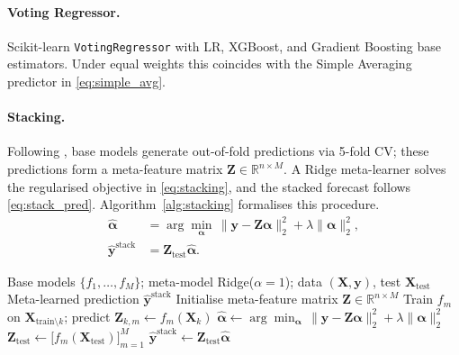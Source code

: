 \documentclass[a4paper,fleqn]{cas-dc}
\begin{document}
\paragraph{Voting Regressor.} Scikit-learn \texttt{VotingRegressor} with LR, XGBoost, and Gradient Boosting base estimators.  Under equal weights this coincides with the Simple Averaging predictor in \eqref{eq:simple_avg}.

\paragraph{Stacking.}  Following \cite{wolpert1992stacking}, base models generate out-of-fold predictions via 5-fold CV; these predictions form a meta-feature matrix $\mathbf{Z}\in\mathbb{R}^{n\times M}$.  A Ridge meta-learner solves the regularised objective in \eqref{eq:stacking}, and the stacked forecast follows \eqref{eq:stack_pred}.  Algorithm~\ref{alg:stacking} formalises this procedure.
\begin{align}
  \boldsymbol{\hat{\alpha}} &= \arg\min_{\boldsymbol{\alpha}}\,
  \|\mathbf{y}-\mathbf{Z}\boldsymbol{\alpha}\|_2^2 + \lambda\|\boldsymbol{\alpha}\|_2^2,
  \label{eq:stacking} \\
  \hat{\mathbf{y}}^{\text{stack}} &= \mathbf{Z}_{\text{test}}\boldsymbol{\hat{\alpha}}.
  \label{eq:stack_pred}
\end{align}

\begin{algorithm}[H]
\caption{Stacking Ensemble (Meta-Learning via 5-Fold CV)}
\label{alg:stacking}
\begin{algorithmic}[1]
\Require Base models $\{f_1,\ldots,f_M\}$; meta-model Ridge($\alpha{=}1$); data $(\mathbf{X},\mathbf{y})$, test $\mathbf{X}_{\text{test}}$
\Ensure Meta-learned prediction $\hat{\mathbf{y}}^{\text{stack}}$
\State Initialise meta-feature matrix $\mathbf{Z}\in\mathbb{R}^{n\times M}$
    \State Train $f_m$ on $\mathbf{X}_{\text{train}\setminus k}$; predict $\mathbf{Z}_{k,m}\gets f_m(\mathbf{X}_k)$
  \EndFor
\EndFor
\State $\boldsymbol{\hat{\alpha}} \gets \arg\min_{\boldsymbol{\alpha}}\,\|\mathbf{y}-\mathbf{Z}\boldsymbol{\alpha}\|_2^2 + \lambda\|\boldsymbol{\alpha}\|_2^2$
\State $\mathbf{Z}_{\text{test}} \gets \bigl[f_m(\mathbf{X}_{\text{test}})\bigr]_{m=1}^{M}$
\State \Return $\hat{\mathbf{y}}^{\text{stack}} \gets \mathbf{Z}_{\text{test}}\boldsymbol{\hat{\alpha}}$
\end{algorithmic}
\end{algorithm}
\end{document}
